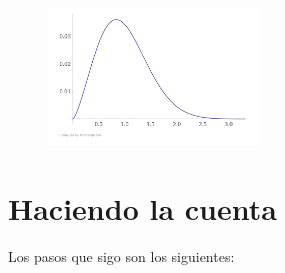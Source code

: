 \begin{figure}[H]
    \begin{small}
        \begin{center}
            \includegraphics[width=0.5\textwidth]{bessel.png}
        \end{center}
        \caption{}
    \end{small}
\end{figure}


\section{Haciendo la cuenta}

Los pasos que sigo son los siguientes: 

\begin{enumerate}
\end{enumerate}


